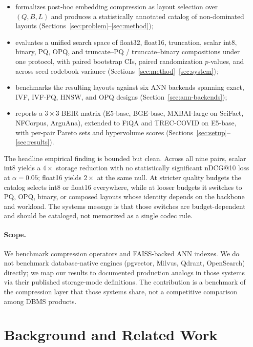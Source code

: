 \documentclass[sigconf]{acmart}
\makeatletter
\newcommand{\ndcg}{nDCG@10}
\makeatother
\begin{document}
\begin{itemize}
  \item formalizes post-hoc embedding compression as layout selection over $(Q, B, L)$ and produces a statistically annotated catalog of non-dominated layouts (Sections~\ref{sec:problem}--\ref{sec:method});
  \item evaluates a unified search space of float32, float16, truncation, scalar int8, binary, PQ, OPQ, and truncate--PQ / truncate--binary compositions under one protocol, with paired bootstrap CIs, paired randomization $p$-values, and across-seed codebook variance (Sections~\ref{sec:method}--\ref{sec:system});
  \item benchmarks the resulting layouts against six ANN backends spanning exact, IVF, IVF-PQ, HNSW, and OPQ designs (Section~\ref{sec:ann-backends});
  \item reports a 3\,$\times$\,3 BEIR matrix (E5-base, BGE-base, MXBAI-large on SciFact, NFCorpus, ArguAna), extended to FiQA and TREC-COVID on E5-base, with per-pair Pareto sets and hypervolume scores (Sections~\ref{sec:setup}--\ref{sec:results}).
\end{itemize}

The headline empirical finding is bounded but clean. Across all nine pairs, scalar int8 yields a $4\times$ storage reduction with no statistically significant \ndcg{} loss at $\alpha{=}0.05$; float16 yields $2\times$ at the same null. At stricter quality budgets the catalog selects int8 or float16 everywhere, while at looser budgets it switches to PQ, OPQ, binary, or composed layouts whose identity depends on the backbone and workload. The systems message is that those switches are budget-dependent and should be cataloged, not memorized as a single codec rule.

\paragraph{Scope.} We benchmark compression operators and FAISS-backed ANN indexes. We do not benchmark database-native engines (pgvector, Milvus, Qdrant, OpenSearch) directly; we map our results to documented production analogs in those systems via their published storage-mode definitions. The contribution is a benchmark of the compression layer that those systems share, not a competitive comparison among DBMS products.

\section{Background and Related Work}
\label{sec:related}
\end{document}
